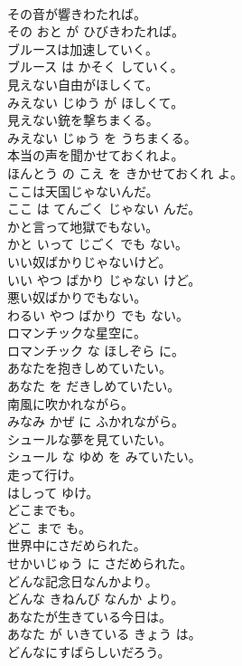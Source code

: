 \documentclass[8pt]{extreport}
\begin{document}
\begin{CJK}{UTF8}{min}
\\	その音が響きわたれば。	
\\	その おと が ひびきわたれば。	
\\	ブルースは加速していく。	
\\	ブルース は かそく していく。	
\\	見えない自由がほしくて。	
\\	みえない じゆう が ほしくて。	
\\	見えない銃を撃ちまくる。	
\\	みえない じゅう を うちまくる。	
\\	本当の声を聞かせておくれよ。	
\\	ほんとう の こえ を きかせておくれ よ。	
\\	ここは天国じゃないんだ。	
\\	ここ は てんごく じゃない んだ。	
\\	かと言って地獄でもない。	
\\	かと いって じごく でも ない。	
\\	いい奴ばかりじゃないけど。	
\\	いい やつ ばかり じゃない けど。	
\\	悪い奴ばかりでもない。	
\\	わるい やつ ばかり でも ない。	
\\	ロマンチックな星空に。	
\\	ロマンチック な ほしぞら に。	
\\	あなたを抱きしめていたい。	
\\	あなた を だきしめていたい。	
\\	南風に吹かれながら。	
\\	みなみ かぜ に ふかれながら。	
\\	シュールな夢を見ていたい。	
\\	シュール な ゆめ を みていたい。	
\\	走って行け。	
\\	はしって ゆけ。	
\\	どこまでも。	
\\	どこ まで も。	
\\	世界中にさだめられた。	
\\	せかいじゅう に さだめられた。	
\\	どんな記念日なんかより。	
\\	どんな きねんび なんか より。	
\\	あなたが生きている今日は。	
\\	あなた が いきている きょう は。	
\\	どんなにすばらしいだろう。	

\end{CJK}
\end{document}
